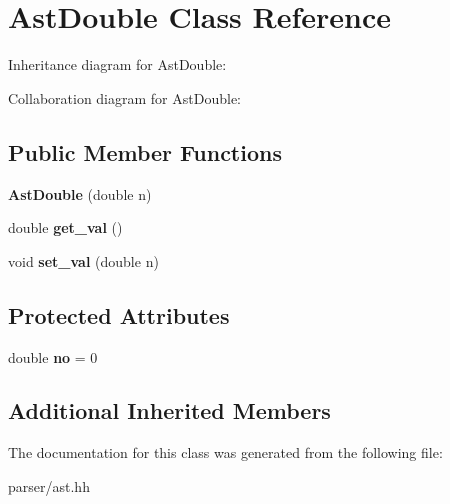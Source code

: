 \hypertarget{classAstDouble}{}\section{Ast\+Double Class Reference}
\label{classAstDouble}


Inheritance diagram for Ast\+Double\+:


Collaboration diagram for Ast\+Double\+:
\subsection*{Public Member Functions}
\begin{DoxyCompactItemize}
\item 
\mbox{\label{classAstDouble_a75b35a34e6126c661e7a81d19e019e8a}} 
{\bfseries Ast\+Double} (double n)
\item 
\mbox{\label{classAstDouble_a8de9a49a6e124b657c980fec45fa5ff6}} 
double {\bfseries get\+\_\+val} ()
\item 
\mbox{\label{classAstDouble_a5bd06ac803ea9042b3ae17f6a3e0d52e}} 
void {\bfseries set\+\_\+val} (double n)
\end{DoxyCompactItemize}
\subsection*{Protected Attributes}
\begin{DoxyCompactItemize}
\item 
\mbox{\label{classAstDouble_ad68d266d46bcbbfa1cd126d6c602ec5e}} 
double {\bfseries no} = 0
\end{DoxyCompactItemize}
\subsection*{Additional Inherited Members}


The documentation for this class was generated from the following file\+:\begin{DoxyCompactItemize}
\item 
parser/ast.\+hh\end{DoxyCompactItemize}
